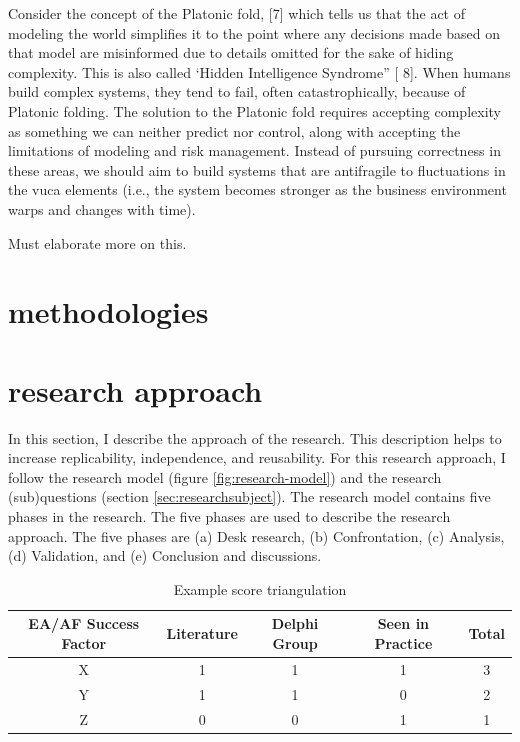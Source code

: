 Consider the concept of the Platonic fold, [7] which tells us that the act of modeling the world
simplifies it to the point where any decisions made based on that model are misinformed due to details omitted for
the sake of hiding complexity. This is also called ‘Hidden Intelligence Syndrome” [ 8]. When humans build complex systems, they tend to fail, often catastrophically, because of Platonic folding. The
solution to the Platonic fold requires accepting complexity as something we can neither predict nor control, along
with accepting the limitations of modeling and risk management. Instead of pursuing correctness in these areas, we
should aim to build systems that are \gls{antifragile} to fluctuations in the \acrshort{vuca} elements (i.e., the system becomes stronger as the business environment warps and changes with time). \parencite[p. 885]{OReilly2019}

\begin{remark}
	Must elaborate more on this.
\end{remark}

\section{methodologies}

\section{research approach}

In this section, I describe the approach of the research. This description helps to increase replicability, independence, and reusability. For this research approach, I follow the research model (figure \ref{fig:research-model}) and the research (sub)questions (section \ref{sec:researchsubject}). The research model contains five phases in the research. The five phases are used to describe the research approach. The five phases are (a) Desk research, (b) Confrontation, (c) Analysis, (d) Validation, and (e) Conclusion and discussions.










\begin{table}[!h]
	\begin{center}
		\begin{tabular}{@{}ccccc@{}}
			\toprule
			EA/AF Success Factor & Literature & Delphi Group & Seen in Practice & Total \\ \midrule
			X    & 1    & 1   & 1   & 3   \\
			Y    & 1    & 1  & 0   & 2   \\
			Z    & 0    & 0   & 1   & 1   \\ \bottomrule
		\end{tabular}
		\caption{Example score triangulation}
		\label{tab:exampletriangulation}
	\end{center}
\end{table}

